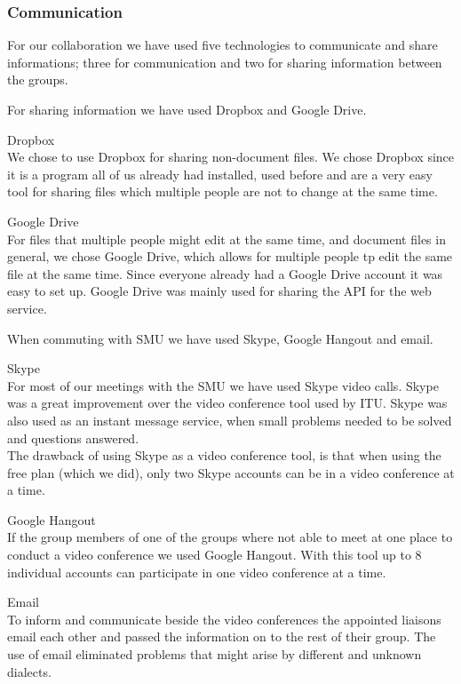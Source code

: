 \subsubsection{Communication}
For our collaboration we have used five technologies to communicate and share informations; three for communication and two for sharing information between the groups.

For sharing information we have used Dropbox and Google Drive. \vspace{-5mm}
\begin{description}
	\item Dropbox \\
		We chose to use Dropbox for sharing non-document files. We chose Dropbox since it is a program all of us already had installed, used before and are a very easy tool for sharing files which multiple people are not to change at the same time.
	\item Google Drive \\
		For files that multiple people might edit at the same time, and document files in general, we chose Google Drive, which allows for multiple people tp edit the same file at the same time. Since everyone already had a Google Drive account it was easy to set up.
		Google Drive was mainly used for sharing the API for the web service.
\end{description}

When commuting with SMU we have used Skype, Google Hangout and email.
\vspace{-5mm}
\begin{description}
	\item Skype \\
		For most of our meetings with the SMU we have used Skype video calls. Skype was a great improvement over the video conference tool used by ITU.
		Skype was also used as an instant message service, when small problems needed to be solved and questions answered. \\
		The drawback of using Skype as a video conference tool, is that when using the free plan (which we did), only two Skype accounts can be in a video conference at a time.
	\item Google Hangout \\
		If the group members of one of the groups where not able to meet at one place to conduct a video conference we used Google Hangout. With this tool up to 8 individual accounts can participate in one video conference at a time.
	\item Email \\
		To inform and communicate beside the video conferences the appointed liaisons email each other and passed the information on to the rest of their group.
		The use of email eliminated problems that might arise by different and unknown dialects.
\end{description}